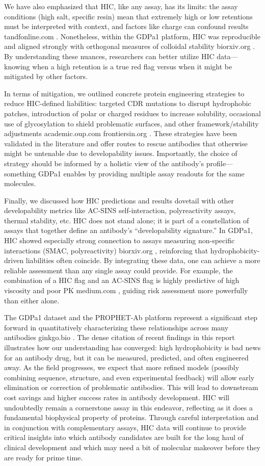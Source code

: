 \documentclass[12pt]{article}
\begin{document}
We have also emphasized that HIC, like any assay, has its limits: the assay conditions (high salt, specific resin) mean that extremely high or low retentions must be interpreted with context, and factors like charge can confound results
tandfonline.com
. Nonetheless, within the GDPa1 platform, HIC was reproducible and aligned strongly with orthogonal measures of colloidal stability
biorxiv.org
. By understanding these nuances, researchers can better utilize HIC data—knowing when a high retention is a true red flag versus when it might be mitigated by other factors.

In terms of mitigation, we outlined concrete protein engineering strategies to reduce HIC-defined liabilities: targeted CDR mutations to disrupt hydrophobic patches, introduction of polar or charged residues to increase solubility, occasional use of glycosylation to shield problematic surfaces, and other framework/stability adjustments
academic.oup.com
frontiersin.org
. These strategies have been validated in the literature and offer routes to rescue antibodies that otherwise might be untenable due to developability issues. Importantly, the choice of strategy should be informed by a holistic view of the antibody’s profile—something GDPa1 enables by providing multiple assay readouts for the same molecules.

Finally, we discussed how HIC predictions and results dovetail with other developability metrics like AC-SINS self-interaction, polyreactivity assays, thermal stability, etc. HIC does not stand alone; it is part of a constellation of assays that together define an antibody’s “developability signature.” In GDPa1, HIC showed especially strong connection to assays measuring non-specific interactions (SMAC, polyreactivity)
biorxiv.org
, reinforcing that hydrophobicity-driven liabilities often coincide. By integrating these data, one can achieve a more reliable assessment than any single assay could provide. For example, the combination of a HIC flag and an AC-SINS flag is highly predictive of high viscosity and poor PK
medium.com
, guiding risk assessment more powerfully than either alone.

The GDPa1 dataset and the PROPHET-Ab platform represent a significant step forward in quantitatively characterizing these relationships across many antibodies
ginkgo.bio
. The dense citation of recent findings in this report illustrates how our understanding has converged: high hydrophobicity is bad news for an antibody drug, but it can be measured, predicted, and often engineered away. As the field progresses, we expect that more refined models (possibly combining sequence, structure, and even experimental feedback) will allow early elimination or correction of problematic antibodies. This will lead to downstream cost savings and higher success rates in antibody development. HIC will undoubtedly remain a cornerstone assay in this endeavor, reflecting as it does a fundamental biophysical property of proteins. Through careful interpretation and in conjunction with complementary assays, HIC data will continue to provide critical insights into which antibody candidates are built for the long haul of clinical development and which may need a bit of molecular makeover before they are ready for prime time.
\end{document}
